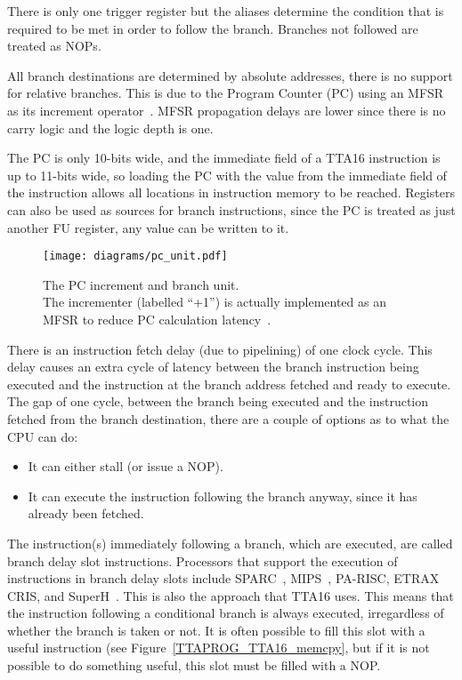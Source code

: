 There is only one trigger register but the aliases determine the condition
that is required to be met in order to follow the branch. Branches not followed
are treated as NOPs.

All branch destinations are determined by absolute addresses, there is no
support for relative branches. This is due to the Program Counter (PC) using an
MFSR as its increment operator~\cite{MFSR_List}. MFSR propagation delays are
lower since there is no carry logic and the logic depth is one.

The PC is only 10-bits wide, and the immediate field of a TTA16 instruction is
up to 11-bits wide, so loading the PC with the value from the immediate
field of the instruction allows all locations in instruction memory to be
reached. Registers can also be used as sources for branch instructions, since
the PC is treated as just another FU register, any value can be written to it.

\begin{figure}[h]
\begin{center}
\texttt{[image: diagrams/pc\_unit.pdf]}
\caption[The PC increment and branch unit]{The PC increment and branch unit. \\
The incrementer (labelled ``+1'') is actually implemented as an MFSR to
reduce PC calculation latency~\cite{MFSR_List}.}
\label{CPU_PC_Unit}
\end{center}
\end{figure}

There is an instruction fetch delay (due to pipelining) of one clock cycle.
This delay causes an extra cycle of latency between the branch instruction being
executed and the instruction at the branch address fetched and ready to
execute. The gap of one cycle, between the branch being executed and the
instruction fetched from the branch destination, there are a couple of options
as to what the CPU can do:
\begin{itemize}
  \item It can either stall (or issue a NOP).
  \item It can execute the instruction following the branch anyway, since it has
already been fetched.
\end{itemize}

The instruction(s) immediately following a branch, which are executed, are called
branch delay slot instructions. Processors that support the execution of
instructions in branch delay slots include SPARC~\cite{SPARC_Arch},
MIPS~\cite{britton2004mal}, PA-RISC, ETRAX CRIS, and SuperH~\cite{SuperH}. This
is also the approach that TTA16 uses. This means that the instruction following a
conditional branch is always executed, irregardless of whether the branch is
taken or not. It is often possible to fill this slot with a useful instruction
(see Figure~\ref{TTAPROG_TTA16_memcpy}, but if it is not possible to do something
useful, this slot must be filled with a NOP.


